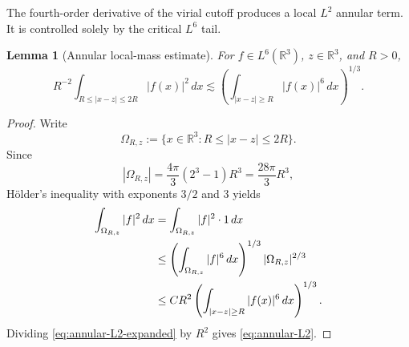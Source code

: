 \documentclass[preprint,12pt]{elsarticle}
\numberwithin{equation}{section}
\newtheorem{lemma}[theorem]{Lemma}
\theoremstyle{remark}
\newcommand{\R}{\mathbb R}
\newcommand{\dd}{\,d}
\begin{document}
The fourth-order derivative of the virial cutoff produces a local $L^2$ annular term. It is controlled solely by the critical $L^6$ tail.

\begin{lemma}[Annular local-mass estimate]\label{lem:annular-L2}
For $f\in L^6(\R^3)$, $z\in\R^3$, and $R>0$,
\begin{equation}\label{eq:annular-L2}
  R^{-2}\int_{R\le|x-z|\le2R}|f(x)|^2\dd x
  \lesssim
  \left(\int_{|x-z|\ge R}|f(x)|^6\dd x\right)^{1/3}.
\end{equation}
\end{lemma}

\begin{proof}
Write
\[
  \Omega_{R,z}:=\{x\in\R^3:R\le|x-z|\le2R\}.
\]
Since
\begin{equation*}
  |\Omega_{R,z}|=\frac{4\pi}{3}(2^3-1)R^3=\frac{28\pi}{3}R^3,
\end{equation*}
H\"older's inequality with exponents $3/2$ and $3$ yields
\begin{align}
  \int_{\Omega_{R,z}}|f|^2\dd x
  &=\int_{\Omega_{R,z}}|f|^2\cdot1\dd x\notag\\
  &\le
  \left(\int_{\Omega_{R,z}}|f|^6\dd x\right)^{1/3}
  |\Omega_{R,z}|^{2/3}\notag\\
  &\le C R^2
  \left(\int_{|x-z|\ge R}|f(x)|^6\dd x\right)^{1/3}.
  \label{eq:annular-L2-expanded}
\end{align}
Dividing \eqref{eq:annular-L2-expanded} by $R^2$ gives \eqref{eq:annular-L2}.
\end{proof}
\end{document}
